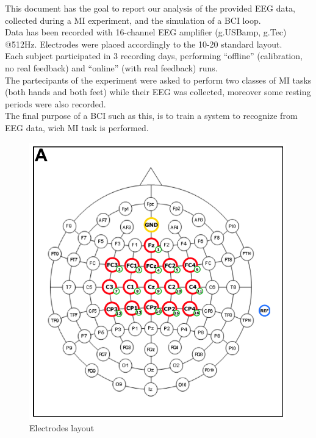 This document has the goal to report our analysis of the provided EEG data, collected during a MI experiment, and the simulation of a BCI loop. \\
Data has been recorded with 16-channel EEG amplifier (g.USBamp, g.Tec) @512Hz. Electrodes were placed accordingly to the 10-20 standard layout. \\
Each subject participated in 3 recording days, performing  “offline” (calibration, no real feedback) and  “online” (with real feedback) runs. \\
The partecipants of the experiment were asked to perform two classes of MI tasks (both hands and both feet) while their EEG was collected, moreover some resting periods were also recorded.\\
The final purpose of a BCI such as this, is to train a system to recognize from EEG data, wich MI task is performed.

\begin{figure}[h!]
  \includegraphics[width=0.4\linewidth]{img/electrodes_layout.PNG}
  \caption{Electrodes layout}
  \label{fig:electrodes_layout}
\end{figure}